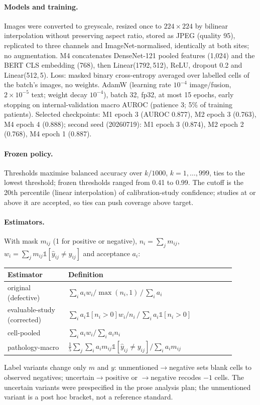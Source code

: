\documentclass[10pt,a4paper]{article}
\begin{document}
\paragraph{Models and training.}
Images were converted to greyscale, resized once to $224\times224$ by bilinear
interpolation without preserving aspect ratio, stored as JPEG (quality 95),
replicated to three channels and ImageNet-normalised, identically at both
sites; no augmentation. M4 concatenates DenseNet-121 pooled features (1,024)
and the BERT CLS embedding (768), then Linear(1792,\,512), ReLU, dropout 0.2 and
Linear(512,\,5). Loss: masked binary cross-entropy averaged over labelled cells
of the batch's images, no weights. AdamW (learning rate $10^{-4}$ image/fusion,
$2\times10^{-5}$ text; weight decay $10^{-4}$), batch 32, fp32, at most 15
epochs, early stopping on internal-validation macro AUROC (patience 3; 5\% of
training patients). Selected checkpoints: M1 epoch 3 (AUROC 0.877), M2 epoch 3
(0.763), M4 epoch 4 (0.888); second seed (20260719): M1 epoch 3 (0.874), M2
epoch 2 (0.768), M4 epoch 1 (0.887).

\paragraph{Frozen policy.}
Thresholds maximise balanced accuracy over $k/1000$, $k=1,\ldots,999$, ties to
the lowest threshold; frozen thresholds ranged from 0.41 to 0.99. The cutoff is
the 20th percentile (linear interpolation) of calibration-study confidence;
studies at or above it are accepted, so ties can push coverage above target.

\paragraph{Estimators.}
With mask $m_{ij}$ (1 for positive or negative), $n_i=\sum_jm_{ij}$,
$w_i=\sum_jm_{ij}\mathbb{1}[\hat y_{ij}\neq y_{ij}]$ and acceptance $a_i$:
\begin{center}\small
\begin{tabular}{p{0.24\linewidth}p{0.66\linewidth}}
\toprule
Estimator & Definition\\
\midrule
original (defective) & $\sum_i a_i w_i/\max(n_i,1)\,/\,\sum_i a_i$\\
evaluable-study (corrected) & $\sum_i a_i\mathbb{1}[n_i>0]w_i/n_i\,/\,\sum_i a_i\mathbb{1}[n_i>0]$\\
cell-pooled & $\sum_i a_iw_i/\sum_ia_in_i$\\
pathology-macro & $\frac15\sum_j\sum_ia_im_{ij}\mathbb{1}[\hat y_{ij}\ne y_{ij}]/\sum_ia_im_{ij}$\\
\bottomrule
\end{tabular}
\end{center}
Label variants change only $m$ and $y$: unmentioned$\to$negative sets blank
cells to observed negatives; uncertain$\to$positive or $\to$negative recodes
$-1$ cells. The uncertain variants were prespecified in the prose analysis plan;
the unmentioned variant is a post hoc bracket, not a reference standard.
\end{document}
